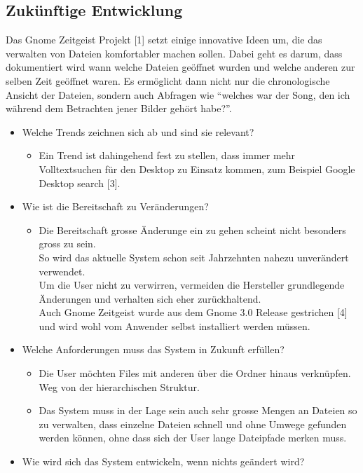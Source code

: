 \documentclass[10pt,paper=a4,final]{scrartcl}
\begin{document}
\subsection{Zuk\"unftige Entwicklung}
Das Gnome Zeitgeist Projekt [1] setzt einige innovative Ideen um, die das verwalten von Dateien komfortabler machen sollen.
Dabei geht es darum, dass dokumentiert wird wann welche Dateien geöffnet wurden und welche anderen zur selben Zeit geöffnet waren. Es ermöglicht dann nicht nur die chronologische Ansicht der Dateien, sondern auch Abfragen wie “welches war der Song, den ich während dem Betrachten jener Bilder gehört habe?”.
\begin{itemize}
  \item Welche Trends zeichnen sich ab und sind sie relevant?
    \begin{itemize}
      \item Ein Trend ist dahingehend fest zu stellen, dass immer mehr Volltextsuchen für den Desktop zu Einsatz kommen, zum Beispiel Google Desktop search [3].
    \end{itemize}
  \item Wie ist die Bereitschaft zu Veränderungen? 
    \begin{itemize}
      \item Die Bereitschaft grosse Änderunge ein zu gehen scheint nicht besonders gross zu sein.\\
	So wird das aktuelle System schon seit Jahrzehnten nahezu unverändert verwendet.\\
	Um die User nicht zu verwirren, vermeiden die Hersteller grundlegende Änderungen und verhalten sich eher zurückhaltend.\\
	Auch Gnome Zeitgeist wurde aus dem Gnome 3.0 Release gestrichen [4] und wird wohl vom Anwender selbst installiert werden müssen.
    \end{itemize}
  \item Welche Anforderungen muss das System in Zukunft erfüllen?
    \begin{itemize}
      \item Die User möchten Files mit anderen über die Ordner hinaus verknüpfen. Weg von der hierarchischen Struktur.
      \item Das System muss in der Lage sein auch sehr grosse Mengen an Dateien so zu verwalten, dass einzelne Dateien schnell und ohne Umwege gefunden werden können, ohne dass sich der User lange Dateipfade merken muss.
    \end{itemize}
  \item Wie wird sich das System entwickeln, wenn nichts geändert wird?

\end{itemize}
\end{document}
